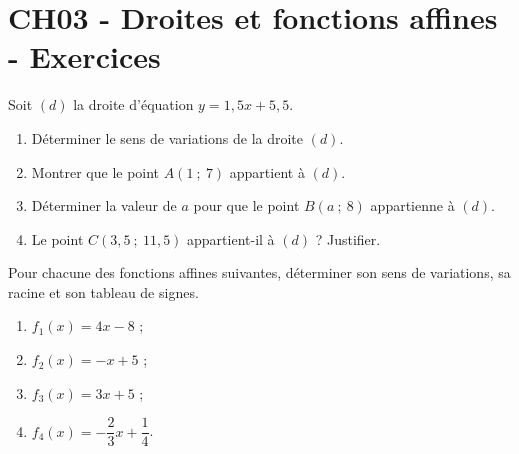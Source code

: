 \documentclass[a4paper,11pt]{article}
\author{Pierquet}
\title{\nomfichier}
\begin{document}
\pagestyle{fancy}

\part{CH03 - Droites et fonctions affines - Exercices}

\smallskip


\medskip

Soit $(d)$ la droite d'équation $y=1,5x+5,5$.
%
\begin{enumerate}
	\item Déterminer le sens de variations de la droite $(d)$.
	\item Montrer que le point $A(1~;~7)$ appartient à $(d)$.
	\item Déterminer la valeur de $a$ pour que le point $B(a~;~8)$ appartienne à $(d)$.
	\item Le point $C(3,5~;~11,5)$ appartient-il à $(d)$ ? Justifier.
\end{enumerate}

\medskip


\medskip

Pour chacune des fonctions affines suivantes, déterminer son sens de variations, sa racine et son tableau de signes.
%
\begin{enumerate}
	\item $f_1(x)=4x-8$ ;
	\item $f_2(x)=-x+5$ ;
	\item $f_3(x)=3x+5$ ;
	\item $f_4(x)=-\dfrac23x+\dfrac14$.
\end{enumerate}

\medskip

\end{document}
